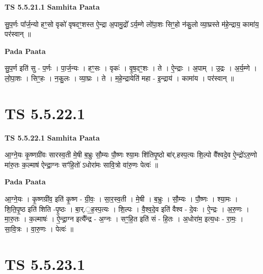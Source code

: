 \documentclass[17pt]{extarticle}
\begin{document}
\textbf{TS 5.5.21.1 } \newline
\textbf{Samhita Paata} \newline

सु॒प॒र्णः पा᳚र्ज॒न्यो हꣳ॒॒सो वृको॑ वृषदꣳ॒॒शस्त ऐ॒न्द्रा अ॒पामु॒द्रो᳚ ऽर्य॒म्णे लो॑पा॒शः सिꣳ॒॒हो न॑कु॒लो व्या॒घ्रस्ते म॑हे॒न्द्राय॒ कामा॑य॒ पर॑स्वान् ॥ \newline

\textbf{Pada Paata} \newline

सु॒प॒र्ण इति॑ सु - प॒र्णः । पा॒र्ज॒न्यः । हꣳ॒॒सः । वृकः॑ । वृ॒ष॒दꣳ॒॒शः । ते । ऐ॒न्द्राः । अ॒पाम् । उ॒द्रः । अ॒र्य॒म्णे । लो॒पा॒शः । सिꣳ॒॒हः । न॒कु॒लः । व्या॒घ्रः । ते । म॒हे॒न्द्रायेति॑ महा - इ॒न्द्राय॑ । कामा॑य । पर॑स्वान् ॥  \newline




\section*{ TS 5.5.22.1 }

\textbf{TS 5.5.22.1 } \newline
\textbf{Samhita Paata} \newline

आ॒ग्ने॒यः कृ॒ष्णग्री॑वः सारस्व॒ती मे॒षी ब॒भ्रुः सौ॒म्यः पौ॒ष्णः श्या॒मः शि॑तिपृ॒ष्ठो बा॑र्.हस्प॒त्यः शि॒ल्पो वै᳚श्वदे॒व ऐ॒न्द्रो॑ऽरु॒णो मा॑रु॒तः क॒ल्माष॑ ऐन्द्रा॒ग्नः सꣳ॑हि॒तो॑ ऽधोरा॑मः सावि॒त्रो वा॑रु॒णः पेत्वः॑ ॥ \newline

\textbf{Pada Paata} \newline

आ॒ग्ने॒यः । कृ॒ष्णग्री॑व॒ इति॑ कृ॒ष्ण - ग्री॒वः॒ । सा॒र॒स्व॒ती । मे॒षी । ब॒भ्रुः । सौ॒म्यः । पौ॒ष्णः । श्या॒मः । शि॒ति॒पृ॒ष्ठ इति॑ शिति -पृ॒ष्ठः । बा॒र्.॒ह॒स्प॒त्यः । शि॒ल्पः । वै॒श्व॒दे॒व इति॑ वैश्व - दे॒वः । ऐ॒न्द्रः । अ॒रु॒णः । मा॒रु॒तः । क॒ल्माषः॑ । ऐ॒न्द्रा॒ग्न इत्यै᳚न्द्र - अ॒ग्नः । सꣳ॒॒हि॒त इति॑ सं - हि॒तः । अ॒धोरा॑म॒ इत्य॒धः - रा॒मः॒ । सा॒वि॒त्रः । वा॒रु॒णः । पेत्वः॑ ॥  \newline




\section*{ TS 5.5.23.1 }
\end{document}
